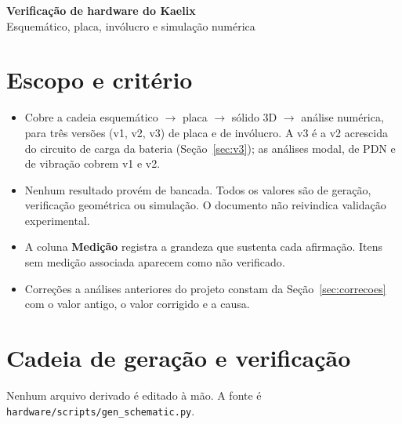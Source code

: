 \documentclass[10pt,a4paper,landscape]{article}
\begin{document}
\begin{center}
{\Large\bfseries Verificação de hardware do Kaelix}\\[2pt]
{\large Esquemático, placa, invólucro e simulação numérica}
\end{center}

\vspace{2pt}

\section{Escopo e critério}

\begin{itemize}
\item Cobre a cadeia esquemático $\rightarrow$ placa $\rightarrow$ sólido 3D $\rightarrow$ análise numérica, para três versões (v1, v2, v3) de placa e de invólucro. A v3 é a v2 acrescida do circuito de carga da bateria (Seção~\ref{sec:v3}); as análises modal, de PDN e de vibração cobrem v1 e v2.
\item Nenhum resultado provém de bancada. Todos os valores são de geração, verificação geométrica ou simulação. O documento não reivindica validação experimental.
\item A coluna \textbf{Medição} registra a grandeza que sustenta cada afirmação. Itens sem medição associada aparecem como \textsf{não verificado}.
\item Correções a análises anteriores do projeto constam da Seção~\ref{sec:correcoes} com o valor antigo, o valor corrigido e a causa.
\end{itemize}

\section{Cadeia de geração e verificação}

Nenhum arquivo derivado é editado à mão. A fonte é \texttt{hardware/scripts/gen\_schematic.py}.
\end{document}
